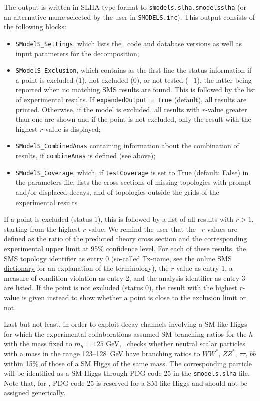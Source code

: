 \documentclass[12pt,a4paper]{article}
\begin{document}
The output is written in SLHA-type format to {\tt smodels.slha.smodelsslha} 
(or an alternative name selected by the user in {\tt SMODELS.inc}).
This output consists of the following blocks: 
\begin{itemize}
\item {\tt SModelS\_Settings}, which lists the \smodels\ code and database versions as well as input parameters for the decomposition; 
\item {\tt SModelS\_Exclusion}, which  
contains as the first line the status information if a point is excluded (1), not excluded (0), or not tested ($-1$), 
the latter being reported when no matching SMS results are found. This is followed by the list of experimental results. 
If {\tt expandedOutput = True} (default), all results are printed. Otherwise, if the model is excluded, all results with $r$-value greater than one are shown and if the point is not excluded, only the result with the highest $r$-value is displayed;
\item {\tt SModelS\_CombinedAnas} containing information about the combination of results, if {\tt combineAnas} is defined (see above);
\item {\tt SModelS\_Coverage}, which,  if \verb|testCoverage| is set to True (default: False) in the parameters file, lists 
the cross sections of missing topologies with prompt and/or displaced decays, and of topologies outside the grids of the experimental results
\end{itemize}

If a point is excluded (status 1), this is followed by a list of all results with $r>1$, starting from the highest $r$-value.  
We remind the user that the \smodels\ $r$-values are defined as the ratio of the predicted theory cross section and the corresponding experimental  upper limit
at 95\% confidence level. 
For each of these results, the SMS topology identifier as entry 0 (so-called Tx-name, see the online \href{https://smodels.github.io/docs/SmsDictionary}{SMS dictionary} 
for an explanation of the terminology), 
the $r$-value as entry 1, a measure of condition violation as entry 2, and the analysis identifier as entry 3 are listed. 
If the point is not excluded (status 0), the result with the highest $r$-value is given instead to show whether a point is close to the exclusion limit or not. 

Last but not least, in order to  exploit decay channels involving a SM-like Higgs for which the experimental collaborations assumed SM branching ratios for the $h$ with the mass fixed to $m_h=125$ GeV, \micro\ checks whether  
neutral scalar particles with a mass in the range 123--128~GeV have branching ratios to $WW^*,\, ZZ^*,\,\tau\tau,\, b\bar{b}$ within 15\% of those of a SM Higgs of the same mass. 
The corresponding particle will be identified as a SM Higgs 
through PDG code 25 in the {\tt smodels.slha} file. 
Note that, for \smodels, PDG code 25 is reserved for a SM-like Higgs and should not be assigned generically. 
\end{document}
